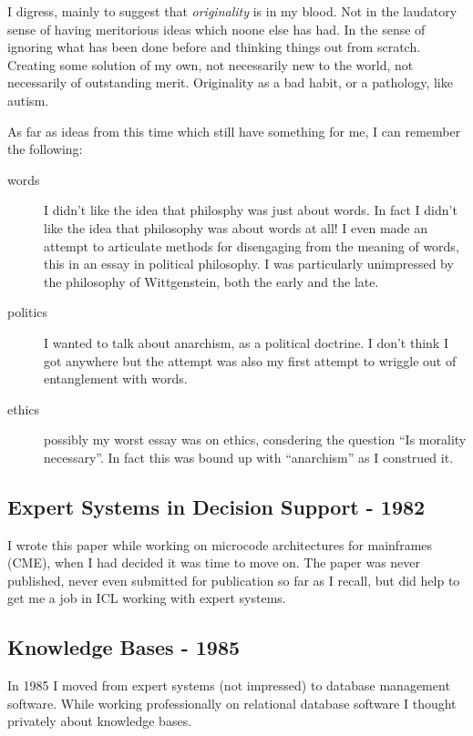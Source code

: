 \documentclass{rbjk}
\begin{document}
\begin{article}
I digress, mainly to suggest that {\it originality} is in my blood.
Not in the laudatory sense of having meritorious ideas which noone else has had.
In the sense of ignoring what has been done before and thinking things out from scratch.
Creating some solution of my own, not necessarily new to the world, not necessarily of outstanding merit.
Originality as a bad habit, or a pathology, like autism.

As far as ideas from this time which still have something for me, I can remember the following:

\begin{description}
\item[words] I didn't like the idea that philosphy was just about words.
In fact I didn't like the idea that philosophy was about words at all!
I even made an attempt to articulate methods for disengaging from the meaning of words, this in an essay in political philosophy.
I was particularly unimpressed by the philosophy of Wittgenstein, both the early and the late.
\item[politics] I wanted to talk about anarchism, as a political doctrine.  I don't think I got anywhere but the attempt was also my first attempt to wriggle out of entanglement with words.
\item[ethics] possibly my worst essay was on ethics, consdering the question ``Is morality necessary''.
In fact this was bound up with ``anarchism'' as I construed it.
\end{description}

\subsection{Expert Systems in Decision Support - 1982}\label{1982}

I wrote this paper while working on microcode architectures for mainframes (CME), when I had decided it was time to move on.
The paper was never published, never even submitted for publication so far as I recall, but did help to get me a job in ICL working with expert systems.

\subsection{Knowledge Bases - 1985}

In 1985 I moved from expert systems (not impressed) to database management software.
While working professionally on relational database software I thought privately about knowledge bases.


\end{article}
\end{document}
